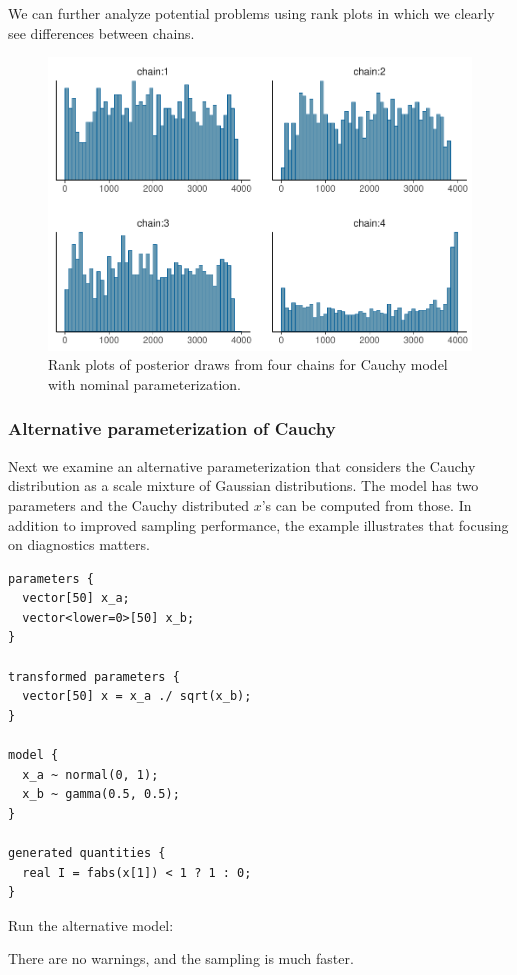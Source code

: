 \documentclass[american,]{article}
\begin{document}
We can further analyze potential problems using rank plots in which we
clearly see differences between chains.

\begin{figure}[t]
  \centering
  \includegraphics[width=0.6\linewidth]{graphics/hist-fit-nom-1.pdf}
  \caption{Rank plots of posterior draws from four chains for Cauchy model with nominal parameterization.}
\end{figure}

\hypertarget{alternative-parameterization-of-cauchy}{%
\subsubsection{Alternative parameterization of
Cauchy}\label{alternative-parameterization-of-cauchy}}

Next we examine an alternative parameterization that considers the
Cauchy distribution as a scale mixture of Gaussian distributions. The
model has two parameters and the Cauchy distributed \(x\)'s can be
computed from those. In addition to improved sampling performance, the
example illustrates that focusing on diagnostics matters.

\begin{verbatim}
parameters {
  vector[50] x_a;
  vector<lower=0>[50] x_b;
}

transformed parameters {
  vector[50] x = x_a ./ sqrt(x_b);
}

model {
  x_a ~ normal(0, 1);
  x_b ~ gamma(0.5, 0.5);
}

generated quantities {
  real I = fabs(x[1]) < 1 ? 1 : 0;
}
\end{verbatim}

Run the alternative model:

There are no warnings, and the sampling is much faster.
\end{document}
